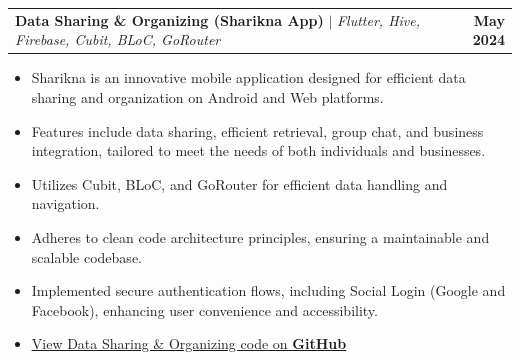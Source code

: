 \documentclass[letterpaper,11pt]{article}
\makeatletter
\newcommand{\resumeItem}[1]{
  \item\small{
    {#1 \vspace{-2pt}}
  }
}
\newcommand{\resumeProjectHeading}[2]{
    \item
    \begin{tabular*}{1.001\textwidth}{l@{\extracolsep{\fill}}r}
      \small#1 & \textbf{\small #2}\\
    \end{tabular*}\vspace{-7pt}
}
\newcommand{\resumeItemListStart}{\begin{itemize}}
\newcommand{\resumeItemListEnd}{\end{itemize}\vspace{-5pt}}
\makeatother
\begin{document}
          \vspace{-13pt}
      
      
    \resumeProjectHeading
      {\textbf{Data Sharing \& Organizing (Sharikna App)} $|$ \emph{Flutter, Hive, Firebase, Cubit, BLoC, GoRouter}}{May 2024}
      \resumeItemListStart
        \resumeItem{Sharikna is an innovative mobile application designed for efficient data sharing and organization on Android and Web platforms.}
        \resumeItem{Features include data sharing, efficient retrieval, group chat, and business integration, tailored to meet the needs of both individuals and businesses.}
        \resumeItem{Utilizes Cubit, BLoC, and GoRouter for efficient data handling and navigation.}
        \resumeItem{Adheres to clean code architecture principles, ensuring a maintainable and scalable codebase.}
        \resumeItem{Implemented secure authentication flows, including Social Login (Google and Facebook), enhancing user convenience and accessibility.}
        \resumeItem{\href{https://github.com/elshoram974/Data-sharing-and-organizing.git}{\underline{View Data Sharing \& Organizing code on \textbf{GitHub}}}}
      \resumeItemListEnd
\end{document}
